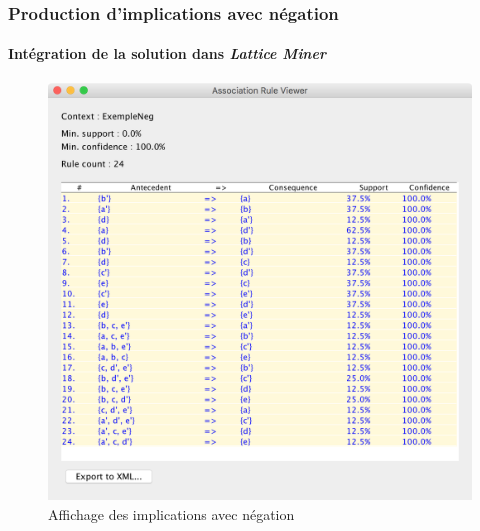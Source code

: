 \documentclass[french]{beamer}
\newcommand{\lm}{\emph{Lattice Miner}\xspace}
\begin{document}
\begin{frame}
\frametitle{Production d'implications avec négation}
\framesubtitle{Intégration de la solution dans \lm}
\begin{figure}[H]
\caption{Affichage des implications avec négation}
\label{fig:lm-neg-rules}
\begin{center}\includegraphics[scale=0.35]{figures/lm-neg-rules.png}\end{center}
\end{figure}
\end{frame}
\end{document}
